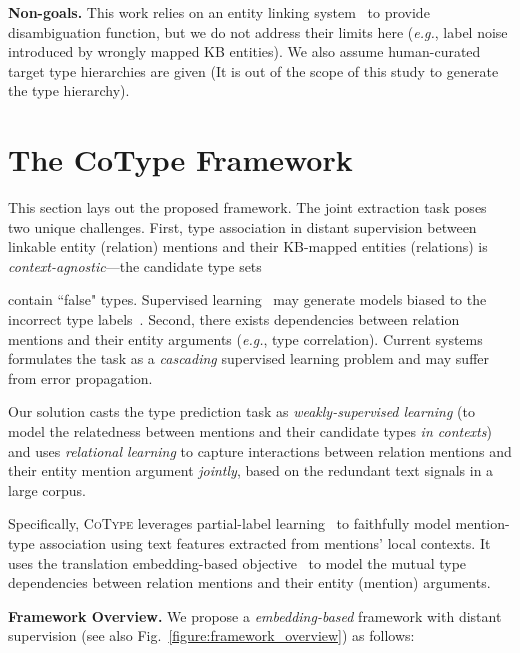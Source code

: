 \documentclass[letterpaper]{sig-alternate-2013}
\def\eg{{\sl e.g.}}
\begin{document}
\smallskip\noindent
\textbf{\small \textsf{Non-goals.}}
This work relies on an entity linking system~\cite{mendes2011dbpedia} to provide disambiguation function, but we do not address their limits here (\eg, label noise introduced by wrongly mapped KB entities). We also assume human-curated target type hierarchies are given (It is out of the scope of this study to generate the type hierarchy).


\section{The CoType Framework}
\label{sec:method}
This section lays out the proposed framework.
The joint extraction task poses two unique challenges. First, type association in distant supervision between linkable entity (relation) mentions and their KB-mapped entities (relations) is \textit{context-agnostic}---the candidate type sets \begin{small}\end{small} contain ``false" types. Supervised learning~\cite{guodong2005exploring,gormley2015improved} may generate models biased to the incorrect type labels~\cite{ren2016label}.
Second, there exists dependencies between relation mentions and their entity arguments (\eg, type correlation). Current systems  formulates the task as a \textit{cascading} supervised learning problem and may suffer from error propagation.


Our solution casts the type prediction task as \textit{weakly-supervised learning} (to model the relatedness between mentions and their candidate types \textit{in contexts}) and uses \textit{relational learning} to capture interactions between relation mentions and their entity mention argument \textit{jointly}, based on the redundant text signals in a large corpus.

Specifically, \textsc{CoType} leverages partial-label learning~\cite{nguyen2008classification} to faithfully model mention-type association using text features extracted from mentions' local contexts. It uses the translation embedding-based objective~\cite{bordes2013translating} to model the mutual type dependencies between relation mentions and their entity (mention) arguments.

\medskip
\noindent \textsf{\textbf{Framework Overview.}}
We propose a \textit{embedding-based} framework with distant supervision (see also Fig.~\ref{figure:framework_overview}) as follows:
\end{document}
